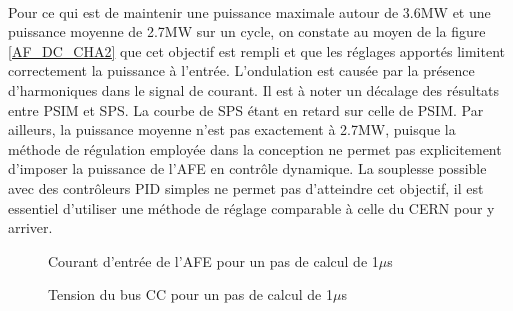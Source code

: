 \paragraph{} Pour ce qui est de maintenir une puissance maximale autour de 3.6MW et une puissance moyenne de 2.7MW sur un cycle, on constate au moyen de la figure \ref{AF_DC_CHA2} que cet objectif est rempli et que les réglages apportés limitent correctement la puissance à l'entrée. L'ondulation est causée par la présence d'harmoniques dans le signal de courant. Il est à noter un décalage des résultats entre PSIM et SPS. La courbe de SPS étant en retard sur celle de PSIM. Par ailleurs, la puissance moyenne n'est pas exactement à 2.7MW, puisque la méthode de régulation employée dans la conception ne permet pas explicitement d'imposer la puissance de l'AFE en contrôle dynamique. La souplesse possible avec des contrôleurs PID simples ne permet pas d'atteindre cet objectif, il est essentiel d'utiliser une méthode de réglage comparable à celle du CERN pour y arriver.

\begin{figure}[htb]
\centering
{}
\caption{Courant d'entrée de l'AFE pour un pas de calcul de 1$\mu$s}
\label{AF_DC_cou1}
\end{figure}


\begin{figure}[htb]
\centering
{}
\caption{Tension du bus CC pour un pas de calcul de 1$\mu$s}
\label{AF_DC_vch1}
\end{figure}

